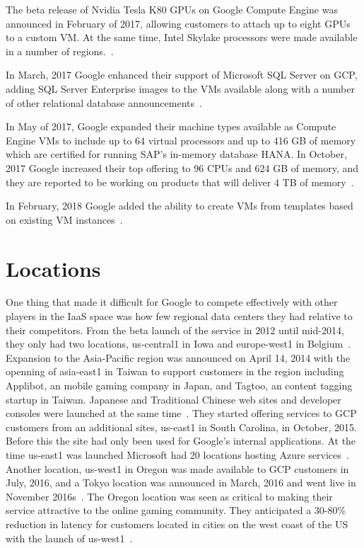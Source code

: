 The beta release of Nvidia Tesla K80 GPUs on Google Compute Engine was
announced in February of 2017, allowing customers to attach up to
eight GPUs to a custom VM. At the same time, Intel Skylake processors
were made available in a number of
regions.~\cite{hid-sp18-419-googleblog20170221}.

In March, 2017 Google enhanced their support of Microsoft SQL Server
on GCP, adding SQL Server Enterprise images to the VMs available along
with a number of other relational database
announcements~\cite{hid-sp18-419-googleblog20170309}.

In May of 2017, Google expanded their machine types available as
Compute Engine VMs to include up to 64 virtual processors and up to
416 GB of memory which are certified for running SAP's in-memory
database HANA. In October, 2017 Google increased their top offering to
96 CPUs and 624 GB of memory, and they are reported to be working on
products that will deliver 4 TB of
memory~\cite{hid-sp18-419-techcrunch-gce-20171005}.

In February, 2018 Google added the ability to create VMs from
templates based on existing VM
instances~\cite{hid-sp18-419-googleblog20180222}.

\section{Locations}
One thing that made it difficult for Google to compete effectively
with other players in the IaaS space was how few regional data centers
they had relative to their competitors. From the beta launch of the
service in 2012 until mid-2014, they only had two locations,
us-central1 in Iowa and europe-west1 in
Belgium~\cite{hid-sp18-419-gcp-history-medium}. Expansion to the
Asia-Pacific region was announced on April 14, 2014 with the openning
of asia-east1 in Taiwan to support customers in the region including
Applibot, an mobile gaming company in Japan, and Tagtoo, an content
tagging startup in Taiwan. Japanese and Traditional Chinese web sites
and developer consoles were launched at the same
time~\cite{hid-sp18-419-googleblog20140414}. They started offering
services to GCP customers from an additional sites, us-east1 in South
Carolina, in October, 2015. Before this the site had only been used
for Google's internal applications. At the time us-east1 was launched
Microsoft had 20 locations hosting Azure
services~\cite{hid-sp18-419-techcrunch-gcp-20151001}. Another location,
us-west1 in Oregon was made available to GCP customers in July, 2016,
and a Tokyo location was announced in March, 2016 and went live in
November 2016s~\cite{hid-sp18-419-googleblog20161108}. The Oregon
location was seen as critical to making their service attractive to
the online gaming community. They anticipated a 30-80\% reduction in
latency for customers located in cities on the west coast of the US
with the launch of us-west1~\cite{hid-sp18-419-googleblog20160720}.

